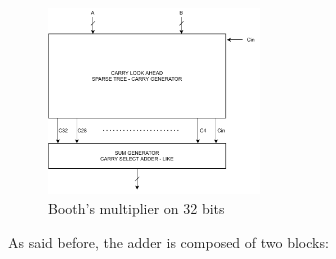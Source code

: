 \begin{figure}[h]
    \centering
    \includegraphics[width=0.5\textwidth]{chapters/5_ExecuteStage/images/P4.pdf}
    \caption{Booth's multiplier on 32 bits}
    \label{fig:P4}
\end{figure}
As said before, the adder is composed of two blocks:
